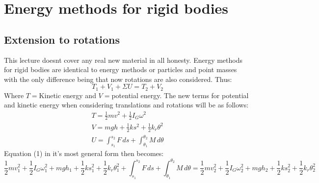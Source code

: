 \documentclass[11pt, a4paper]{article}
\begin{document}
\setcounter{section}{13}
\section{Energy methods for rigid bodies}
\subsection{Extension to rotations}
This lecture doesnt cover any real new material in all honesty. Energy methods for rigid bodies are identical to energy methods  or particles and point masses with the only difference being that now rotations are also considered. Thus:
\begin{equation}
  T_1 + V_1 + \Sigma U = T_2 + V_2
\end{equation}
Where $T=$Kinetic energy and $V=$potential energy. The new terms for potential and kinetic energy when considering translations and rotations will be as follows:
\begin{gather}
  T = \frac{1}{2}mv^2 + \frac{1}{2}I_G\omega^2\\
  V = mgh + \frac{1}{2}ks^2 + \frac{1}{2}k_r\theta^2\\
  U = \int_{s_1}^{s_2} F\,ds + \int_{\theta_1}^{\theta_2} M\,d\theta
\end{gather}
Equation (1) in it's most general form then becomes:
\begin{equation}
  \frac{1}{2}mv_1^2 + \frac{1}{2}I_G\omega_1^2 + mgh_1 + \frac{1}{2}ks_1^2 + \frac{1}{2}k_r\theta_1^2 +\int_{s_1}^{s_2} F\,ds + \int_{\theta_1}^{\theta_2} M\,d\theta =  \frac{1}{2}mv_2^2 + \frac{1}{2}I_G\omega_2^2 + mgh_2 + \frac{1}{2}ks_2^2 + \frac{1}{2}k_r\theta_2^2
\end{equation}
\end{document}

